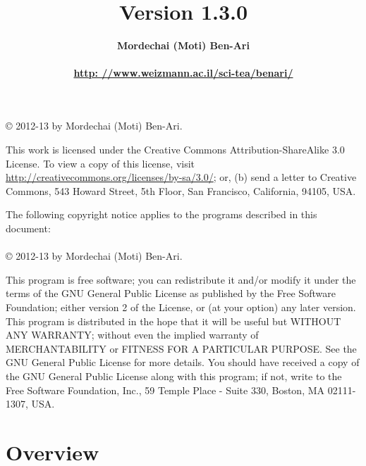 \documentclass[11pt]{report}
\title{\bfseries \ls\\\mbox{}\\\mbox{}\\
\bfseries\normalsize Version 1.3.0}
\author{\bfseries Mordechai (Moti) Ben-Ari\\\mbox{}\\
\url{http: //www.weizmann.ac.il/sci-tea/benari/}}
\begin{document}
\maketitle

\thispagestyle{empty}

\vspace*{\fill}

\begin{center}
\copyright{} 2012-13 by Mordechai (Moti) Ben-Ari.
\end{center}
This work is licensed under the Creative Commons Attribution-ShareAlike 3.0
License. To view a copy of this license, visit
\url{http://creativecommons.org/licenses/by-sa/3.0/}; or, (b) send a letter
to Creative Commons, 543 Howard Street, 5th Floor, San Francisco,
California, 94105, USA.

\bigskip\bigskip

 
\begin{center}
The following copyright notice applies to the programs described in this
document:\mbox{}\\\mbox{}\\
\copyright{} 2012-13 by Mordechai (Moti) Ben-Ari.
\end{center}

This program is free software; you can redistribute it and/or
modify it under the terms of the GNU General Public License
as published by the Free Software Foundation; either version 2
of the License, or (at your option) any later version.
This program is distributed in the hope that it will be useful
but WITHOUT ANY WARRANTY; without even the implied warranty of
MERCHANTABILITY or FITNESS FOR A PARTICULAR PURPOSE.
See the GNU General Public License for more details.
You should have received a copy of the GNU General Public License
along with this program; if not, write to the Free Software
Foundation, Inc., 59 Temple Place - Suite 330, Boston, MA
02111-1307, USA.

\vspace*{\fill}

\setcounter{tocdepth}{1}
\tableofcontents

\thispagestyle{empty}

\setcounter{page}{0}

\newpage


\section*{Overview}
\end{document}
